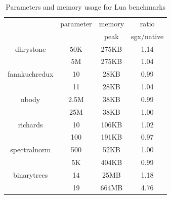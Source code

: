 \newcommand{\higparamcolor}{\rowcolor[rgb]{0.79,0.91,0.90}\cellcolor{white}}
\newcommand{\lowparamcolor}{\rowcolor[rgb]{0.94,0.88,0.76}\cellcolor{white}}
\begin{table}[h!]
    \centering
    \begin{tabular}{|c|c|c|c|}
    \hline
               &parameter  &memory      &ratio \\
               &           &peak        &sgx/native \\
    \hline
\lowparamcolor
dhrystone      &50K        &275KB       & 1.14 \\
\higparamcolor
               &5M         &275KB       & 1.04 \\
    \hline
\lowparamcolor
fannkuchredux  &10         &28KB        & 0.99 \\
\higparamcolor
               &11         &28KB        & 1.04 \\
    \hline
\lowparamcolor
nbody          &2.5M       &38KB        & 0.99 \\
\higparamcolor
               &25M        &38KB        & 1.00 \\
    \hline
\lowparamcolor
richards       &10         &106KB       & 1.02 \\
\higparamcolor
               &100        &191KB       & 0.97 \\
    \hline
\lowparamcolor
spectralnorm   &500        &52KB        & 1.00 \\
\higparamcolor
               &5K         &404KB       & 0.99 \\
    \hline
\lowparamcolor
binarytrees    &14         &25MB        & 1.18 \\
\higparamcolor
               &19         &664MB       & 4.76 \\
    \hline
    \end{tabular}
    \caption{\label{tab:luabmarks}Parameters and memory usage for Lua benchmarks}
\end{table}

